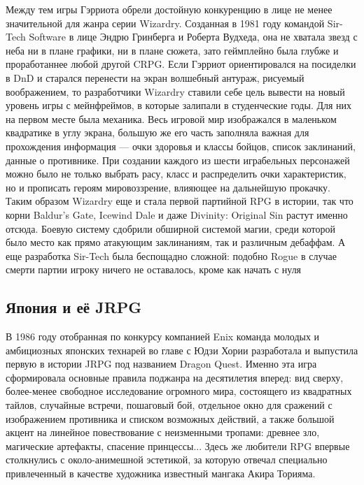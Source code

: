 Между тем игры Гэрриота обрели достойную конкуренцию в лице не менее значительной для жанра серии Wizardry. Созданная в 1981 году командой Sir-Tech Software в лице Эндрю Гринберга и Роберта Вудхеда, она не хватала звезд с неба ни в плане графики, ни в плане сюжета, зато геймплейно была глубже и проработаннее любой другой CRPG. Если Гэрриот ориентировался на посиделки в DnD и старался перенести на экран волшебный антураж, рисуемый воображением, то разработчики Wizardry ставили себе цель вывести на новый уровень игры с мейнфреймов, в которые залипали в студенческие годы. Для них на первом месте была механика. 
Весь игровой мир изображался в маленьком квадратике в углу экрана, большую же его часть заполняла важная для прохождения информация — очки здоровья и классы бойцов, список заклинаний, данные о противнике. При создании каждого из шести играбельных персонажей можно было не только выбрать расу, класс и распределить очки характеристик, но и прописать героям мировоззрение, влияющее на дальнейшую прокачку. Таким образом Wizardry еще и стала первой партийной RPG в истории, так что корни Baldur’s Gate, Icewind Dale и даже Divinity: Original Sin растут именно отсюда. Боевую систему сдобрили обширной системой магии, среди которой было место как прямо атакующим заклинаниям, так и различным дебаффам. А еще разработка Sir-Tech была беспощадно сложной: подобно Rogue в случае смерти партии игроку ничего не оставалось, кроме как начать с нуля

\subsection{Япония и её JRPG}
В 1986 году отобранная по конкурсу компанией Enix команда молодых и амбициозных японских технарей во главе с Юдзи Хории разработала и выпустила первую в истории JRPG под названием Dragon Quest. Именно эта игра сформировала основные правила поджанра на десятилетия вперед: вид сверху, более-менее свободное исследование огромного мира, состоящего из квадратных тайлов, случайные встречи, пошаговый бой, отдельное окно для сражений с изображением противника и списком возможных действий, а также большой акцент на линейное повествование с неизменными тропами: древнее зло, магические артефакты, спасение принцессы... Здесь же любители RPG впервые столкнулись с около-анимешной эстетикой, за которую отвечал специально привлеченный в качестве художника известный мангака Акира Торияма.

